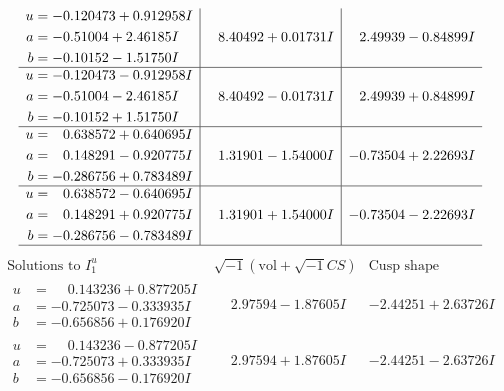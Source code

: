 \documentclass[1p]{elsarticle_modified}
\theoremstyle{definition}
\newcommand{\I}{\sqrt{-1}}
\begin{document}
$$\begin{array}{c|c|c}
\begin{aligned}
u &= -0.120473 + 0.912958 I \\
a &= -0.51004 + 2.46185 I \\
b &= -0.10152 - 1.51750 I\end{aligned}
 & \phantom{-}8.40492 + 0.01731 I & \phantom{-}2.49939 - 0.84899 I \\ \hline\begin{aligned}
u &= -0.120473 - 0.912958 I \\
a &= -0.51004 - 2.46185 I \\
b &= -0.10152 + 1.51750 I\end{aligned}
 & \phantom{-}8.40492 - 0.01731 I & \phantom{-}2.49939 + 0.84899 I \\ \hline\begin{aligned}
u &= \phantom{-}0.638572 + 0.640695 I \\
a &= \phantom{-}0.148291 - 0.920775 I \\
b &= -0.286756 + 0.783489 I\end{aligned}
 & \phantom{-}1.31901 - 1.54000 I & -0.73504 + 2.22693 I \\ \hline\begin{aligned}
u &= \phantom{-}0.638572 - 0.640695 I \\
a &= \phantom{-}0.148291 + 0.920775 I \\
b &= -0.286756 - 0.783489 I\end{aligned}
 & \phantom{-}1.31901 + 1.54000 I & -0.73504 - 2.22693 I\\
 \hline 
 \end{array}$$\newpage$$\begin{array}{c|c|c}  
\text{Solutions to }I^u_{1}& \I (\text{vol} + \sqrt{-1}CS) & \text{Cusp shape}\\
 \hline 
\begin{aligned}
u &= \phantom{-}0.143236 + 0.877205 I \\
a &= -0.725073 - 0.333935 I \\
b &= -0.656856 + 0.176920 I\end{aligned}
 & \phantom{-}2.97594 - 1.87605 I & -2.44251 + 2.63726 I \\ \hline\begin{aligned}
u &= \phantom{-}0.143236 - 0.877205 I \\
a &= -0.725073 + 0.333935 I \\
b &= -0.656856 - 0.176920 I\end{aligned}
 & \phantom{-}2.97594 + 1.87605 I & -2.44251 - 2.63726 I \\ \hline\begin{aligned}

\end{aligned}
\end{array}$$
\end{document}
